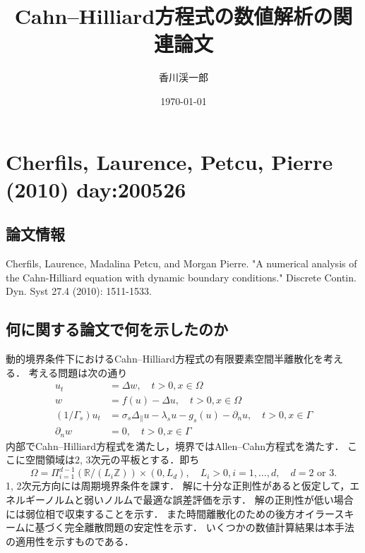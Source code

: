 \documentclass[openary, a4paper, oneside]{jsarticle}
\begin{document}
\title{Cahn--Hilliard方程式の数値解析の関連論文}
\author{香川渓一郎}
\date{\today}
\maketitle
\setcounter{tocdepth}{1}
\tableofcontents

\section{Cherfils, Laurence, Petcu, Pierre (2010) day:200526}
  \subsection{論文情報}
  Cherfils, Laurence, Madalina Petcu, and Morgan Pierre. "A numerical analysis of the Cahn-Hilliard equation with dynamic boundary conditions." Discrete Contin. Dyn. Syst 27.4 (2010): 1511-1533.
  \subsection{何に関する論文で何を示したのか}
  動的境界条件下におけるCahn--Hilliard方程式の有限要素空間半離散化を考える．
  考える問題は次の通り
  \begin{equation}
    \begin{aligned}
    u_{t} &=\Delta w, \quad t>0, x \in \Omega \\
    w &=f(u)-\Delta u, \quad t>0, x \in \Omega \\
    \left(1 / \Gamma_{s}\right) u_{t} &=\sigma_{s} \Delta_{\|} u-\lambda_{s} u-g_{s}(u)-\partial_{n} u, \quad t>0, x \in \Gamma \\
    \partial_{n} w &=0, \quad t>0, x \in \Gamma
    \end{aligned}
  \end{equation}
  内部でCahn--Hilliard方程式を満たし，境界ではAllen--Cahn方程式を満たす．
  ここに空間領域は2, 3次元の平板とする．即ち
  \begin{equation}
    \Omega=\Pi_{i=1}^{d-1}\left(\mathbb{R} /\left(L_{i} \mathbb{Z}\right)\right) \times\left(0, L_{d}\right), \quad L_{i}>0, i=1, \ldots, d, \quad d=2 \text { or } 3.
  \end{equation}
  1, 2次元方向には周期境界条件を課す．
  解に十分な正則性があると仮定して，エネルギーノルムと弱いノルムで最適な誤差評価を示す．
  解の正則性が低い場合には弱位相で収束することを示す．
  また時間離散化のための後方オイラースキームに基づく完全離散問題の安定性を示す．
  いくつかの数値計算結果は本手法の適用性を示すものである．
\end{document}
